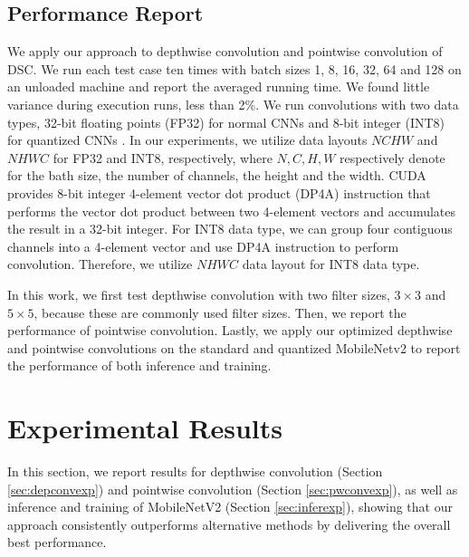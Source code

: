 \subsection{Performance Report}
We apply our approach to depthwise convolution and pointwise convolution of DSC.  We run each test case ten times with batch sizes 1, 8,
16, 32, 64 and 128 on an unloaded machine and report the averaged running time. We found little variance during execution runs, less than
2\%. We run convolutions with two data types, 32-bit floating points (FP32) for normal CNNs and 8-bit integer (INT8) for quantized CNNs
\cite{nagel2019data}. In our experiments, we utilize data layouts $NCHW$ and $NHWC$ for FP32 and INT8, respectively, where $N, C,
H, W$ respectively denote for the bath size, the number of channels, the height and the width. CUDA \cite{cudatoolkit} provides 8-bit integer 4-element vector dot product (DP4A) instruction that performs the vector dot product between two 4-element vectors and accumulates the result in a 32-bit integer. For INT8 data type, we can group four contiguous channels into a 4-element vector and use DP4A instruction to perform convolution. Therefore, we utilize $NHWC$ data layout for INT8 data type.

In this work, we first test depthwise convolution with two filter sizes, $3 \times 3$ and $5 \times 5$, because these are commonly used
filter sizes. Then, we report the performance of pointwise convolution. Lastly, we apply our optimized depthwise and pointwise convolutions
on the standard and quantized MobileNetv2 to report the performance of both inference and training.
%

\section{Experimental Results}
\label{exp} In this section, we report results for depthwise convolution (Section \ref{sec:depconvexp}) and pointwise convolution (Section
\ref{sec:pwconvexp}), as well as inference and training of MobileNetV2 (Section \ref{sec:inferexp}), showing that our approach consistently
outperforms alternative methods by delivering the overall best performance.


